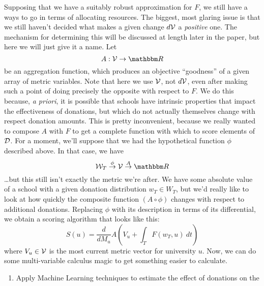 \documentclass[paper.tex]{subfiles}
\begin{document}
	Supposing that we have a suitably robust approximation for $F$, we still have a ways to go in terms of allocating resources. The biggest, most glaring issue is that we still haven't decided what makes a given change $d\mathcal{V}$ a \emph{positive} one. The mechanism for determining this will be discussed at length later in the paper, but here we will just give it a name. Let
	\begin{equation}
		A : \V \to \Re
	\end{equation}
	be an aggregation function, which produces an objective ``goodness'' of a given array of metric variables. Note that here we use $\mathcal{V}$, not $d\mathcal{V}$, even after making such a point of doing precisely the opposite with respect to $F$. We do this because, \emph{a priori}, it is possible that schools have intrinsic properties that impact the effectiveness of donations, but which do not actually themselves change with respect donation amounts. This is pretty inconvenient, because we really wanted to compose $A$ with $F$ to get a complete function with which to score elements of $\mathcal{D}$. For a moment, we'll suppose that we had the hypothetical function $\phi$ described above. In that case, we have
	\[ \W_T \overset{\phi}{\to} \V \overset{A}{\to} \Re \] 
	\ldots but this still isn't exactly the metric we're after. We have some absolute value of a school with a given donation distribution $w_T \in W_T$, but we'd really like to look at how quickly the composite function $(A \circ \phi)$ changes with respect to additional donations. Replacing $\phi$ with its description in terms of its differential, we obtain a scoring algorithm that looks like this:
	\begin{equation}
		S(u) =  \frac{d}{dM_u} A\left(V_u + \int_{T} F(w_T, u)~dt\right)
	\end{equation}
	where $V_u \in \mathcal{V}$ is the most current metric vector for university $u$. Now, we can do some multi-variable calculus magic to get something easier to calculate.

	\begin{enumerate}
		\item Apply Machine Learning techniques to estimate the effect of donations on the 
	\end{enumerate}
	
	
\end{document}
